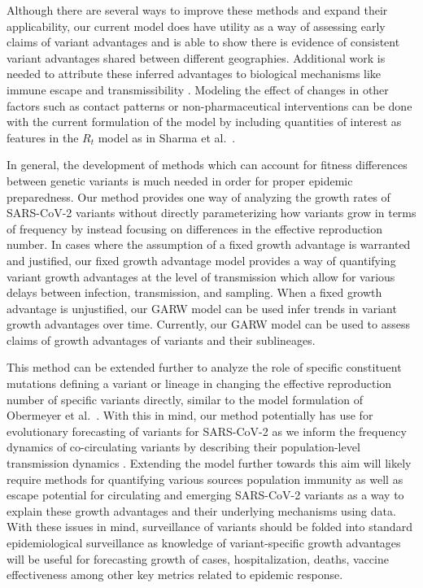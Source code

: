 Although there are several ways to improve these methods and expand their applicability, our current model does have utility as a way of assessing early claims of variant advantages and is able to show there is evidence of consistent variant advantages shared between different geographies.
Additional work is needed to attribute these inferred advantages to biological mechanisms like immune escape and transmissibility \cite{tao2021biological}.
Modeling the effect of changes in other factors such as contact patterns or non-pharmaceutical interventions can be done with the current formulation of the model by including quantities of interest as features in the $R_{t}$ model as in Sharma et al.\ \cite{Sharma2021}.

In general, the development of methods which can account for fitness differences between genetic variants is much needed in order for proper epidemic preparedness.
Our method provides one way of analyzing the growth rates of SARS-CoV-2 variants without directly parameterizing how variants grow in terms of frequency by instead focusing on differences in the effective reproduction number.
In cases where the assumption of a fixed growth advantage is warranted and justified, our fixed growth advantage model provides a way of quantifying variant growth advantages at the level of transmission which allow for various delays between infection, transmission, and sampling.
When a fixed growth advantage is unjustified, our GARW model can be used infer trends in variant growth advantages over time.
Currently, our GARW model can be used to assess claims of growth advantages of variants and their sublineages.

This method can be extended further to analyze the role of specific constituent mutations defining a variant or lineage in changing the effective reproduction number of specific variants directly, similar to the model formulation of Obermeyer et al.\ \cite{obermeyer2022analysis}.
With this in mind, our method potentially has use for evolutionary forecasting of variants for SARS-CoV-2 as we inform the frequency dynamics of co-circulating variants by describing their population-level transmission dynamics \cite{abousamra2024fitness}.
Extending the model further towards this aim will likely require methods for quantifying various sources population immunity as well as escape potential for circulating and emerging SARS-CoV-2 variants as a way to explain these growth advantages and their underlying mechanisms using data.
With these issues in mind, surveillance of variants should be folded into standard epidemiological surveillance as knowledge of variant-specific growth advantages will be useful for forecasting growth of cases, hospitalization, deaths, vaccine effectiveness among other key metrics related to epidemic response.

